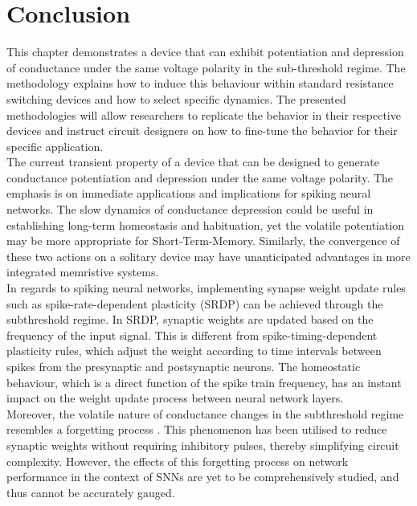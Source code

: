 \section[Conclusion]{Conclusion}

\noindent This chapter demonstrates a device that can exhibit potentiation and depression of conductance under the same voltage polarity in the sub-threshold regime. The methodology explains how to induce this behaviour within standard resistance switching devices and how to select specific dynamics. The presented methodologies will allow researchers to replicate the behavior in their respective devices and instruct circuit designers on how to fine-tune the behavior for their specific application.\\

\noindent The current transient property of a device that can be designed to generate conductance potentiation and depression under the same voltage polarity. The emphasis is on immediate applications and implications for spiking neural networks. The slow dynamics of conductance depression could be useful in establishing long-term homeostasis and habituation, yet the volatile potentiation may be more appropriate for Short-Term-Memory. Similarly, the convergence of these two actions on a solitary device may have unanticipated advantages in more integrated memristive systems.\\

\noindent In regards to spiking neural networks, implementing synapse weight update rules such as spike-rate-dependent plasticity (SRDP) \cite{huang2019binary} can be achieved through the subthreshold regime. In SRDP, synaptic weights are updated based on the frequency of the input signal. This is different from spike-timing-dependent plasticity rules, which adjust the weight according to time intervals between spikes from the presynaptic and postsynaptic neurons. The homeostatic behaviour, which is a direct function of the spike train frequency, has an instant impact on the weight update process between neural network layers.\\

\noindent Moreover, the volatile nature of conductance changes in the subthreshold regime resembles a forgetting process \cite{li2020enhanced}. This phenomenon has been utilised to reduce synaptic weights without requiring inhibitory pulses, thereby simplifying circuit complexity.  However, the effects of this forgetting process on network performance in the context of SNNs are yet to be comprehensively studied, and thus cannot be accurately gauged.\\

